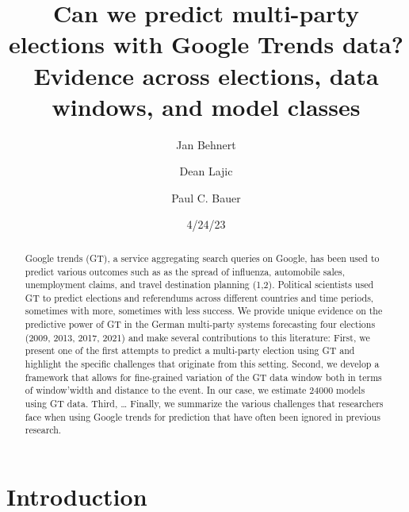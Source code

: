 \documentclass[
  letterpaper,
  DIV=11,
  numbers=noendperiod]{scrartcl}
\title{Can we predict multi-party elections with Google Trends data?
Evidence across elections, data windows, and model classes}
\author{Jan Behnert \and Dean Lajic \and Paul C. Bauer}
\date{4/24/23}
\renewcommand*\contentsname{Table of contents}
\newcommand\contentsname{Table of contents}
\begin{document}
\maketitle
\begin{abstract}
Google trends (GT), a service aggregating search queries on Google, has
been used to predict various outcomes such as as the spread of
influenza, automobile sales, unemployment claims, and travel destination
planning (1,2). Political scientists used GT to predict elections and
referendums across different countries and time periods, sometimes with
more, sometimes with less success. We provide unique evidence on the
predictive power of GT in the German multi-party systems forecasting
four elections (2009, 2013, 2017, 2021) and make several contributions
to this literature: First, we present one of the first attempts to
predict a multi-party election using GT and highlight the specific
challenges that originate from this setting. Second, we develop a
framework that allows for fine-grained variation of the GT data window
both in terms of window'width and distance to the event. In our case, we
estimate 24000 models using GT data. Third, \ldots{} Finally, we
summarize the various challenges that researchers face when using Google
trends for prediction that have often been ignored in previous research.
\end{abstract}
\ifdefined\Shaded\renewenvironment{Shaded}{\begin{tcolorbox}[sharp corners, boxrule=0pt, frame hidden, interior hidden, borderline west={3pt}{0pt}{shadecolor}, breakable, enhanced]}{\end{tcolorbox}}\fi

\renewcommand*\contentsname{Table of contents}
{
\hypersetup{linkcolor=}
\setcounter{tocdepth}{3}
\tableofcontents
}
\hypertarget{introduction}{%
\section{Introduction}\label{introduction}}
\end{document}
